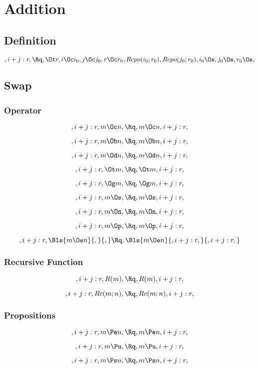 \chapter{Addition}

\bigskip
\bigskip
\section{Definition}
\[, i+j:r, \Rq , \Ot r, i \Oc i_0, j \Oc j_0, r \Oc r_0, Rcpo(i_0;r_0), Rcpo(j_0;r_0), i_0 \Os, j_0 \Os, r_0 \Os, \]



\bigskip
\bigskip
\section{Swap}
\subsection{Operator}
\[, i+j:r, m \Oc n, \Rq , m \Oc n, i+j:r,\]

\[, i+j:r, m \Ob n, \Rq , m \Ob n, i+j:r,\]

\[, i+j:r, m \Od n, \Rq , m \Od n, i+j:r,\]

\[, i+j:r, \Ot m, \Rq , \Ot m, i+j:r,\]

\[, i+j:r, \Og m, \Rq , \Og m, i+j:r,\]

\[, i+j:r, m \Os, \Rq , m \Os, i+j:r,\]

\[, i+j:r, m \On, \Rq , m \On, i+j:r,\]

\[, i+j:r, m \Op, \Rq , m \Op, i+j:r,\]

\[, i+j:r, \Bls{m \Oe n}{,}{,} \Rq , \Bls{m \Oe n}{, i+j:r,}{, i+j:r,}\]


\bigskip
\bigskip
\subsection{Recursive Function}
\[, i+j:r, R(m), \Rq , R(m), i+j:r,\]

\[, i+j:r, Rc(m;n), \Rq , Rc(m;n), i+j:r,\]



\bigskip
\bigskip
\subsection{Propositions}
\[, i+j:r, m \Pe n, \Rq , m \Pe n, i+j:r,\]

\[, i+j:r, m \Pu, \Rq , m \Pu, i+j:r,\]

\[, i+j:r, m \Ps n, \Rq , m \Ps n, i+j:r,\]

